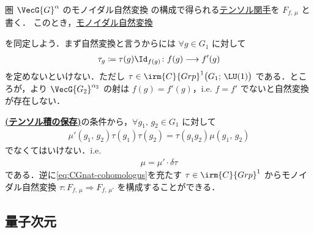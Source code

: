 \documentclass[TQFT_main]{subfiles}
\begin{document}
\begin{myexample}[label=def:CG-monoidalnat]{圏 $\VecG{G}^\alpha$ のモノイダル自然変換}
    の構成で得られる\hyperref[def:tensor-functor]{テンソル関手}を $F_{f,\, \mu}$ と書く．
    このとき，\hyperref[def:monoidal-nat]{モノイダル自然変換} 
    \begin{center}
    \end{center}
    を同定しよう．まず自然変換と言うからには $\forall g \in G_1$ に対して
    \begin{align}
        \tau_g \coloneqq \tau(g) \Id_{f(g)} \colon f(g) \lto f'(g)
    \end{align}
    を定めないといけない．ただし $\tau \in \irm{C}{Grp}^1\bigl(G_1;\, \LU(1)\bigr)$ である．ところが，より $\VecG{G_2}^{\alpha_2}$ の射は $f(g) = f'(g)$，i.e. $f = f'$ でないと自然変換が存在しない．

    \hyperref[def:monoidal-nat]{\textsf{\textbf{(テンソル積の保存)}}}の条件から，$\forall g_1,\, g_2 \in G_1$ に対して
    \begin{align}
        \mu'(g_1,\, g_2) \tau(g_1) \tau(g_2) = \tau(g_1g_2)\mu(g_1,\, g_2)
    \end{align}
    でなくてはいけない．i.e.
    \begin{align}
        \label{eq:CGnat-cohomologus}
        \mu = \mu' \cdot \delta \tau
    \end{align}
    である．逆に\eqref{eq:CGnat-cohomologus}を充たす $\tau \in \irm{C}{Grp}^1$ からモノイダル自然変換 $\tau \colon F_{f,\, \mu} \Longrightarrow F_{f,\, \mu'}$ を構成することができる．
\end{myexample}


\subsection{量子次元}
\end{document}
